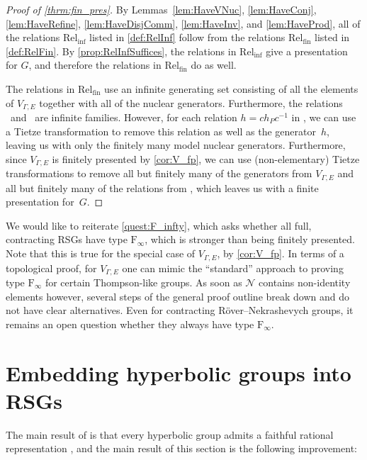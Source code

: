 \documentclass[11pt,letterpaper]{amsart}
\theoremstyle{definition}
\newcommand{\Nuc}{\mathcal{N}}
\newcommand{\Rel}{\mathrm{Rel}}
\newcommand{\F}{\mathrm{F}}
\begin{document}
\begin{proof}[Proof of \cref{thrm:fin_pres}]
By Lemmas~\ref{lem:HaveVNuc}, \ref{lem:HaveConj}, \ref{lem:HaveRefine}, \ref{lem:HaveDisjComm}, \ref{lem:HaveInv}, and \ref{lem:HaveProd}, all of the relations $\Rel_{\mathrm{inf}}$ listed in \cref{def:RelInf} follow from the relations $\Rel_{\mathrm{fin}}$ listed in \cref{def:RelFin}.  By \cref{prop:RelInfSuffices}, the relations in $\Rel_{\mathrm{inf}}$ give a presentation for $G$, and therefore the relations in $\Rel_{\mathrm{fin}}$ do as well.

The relations in $\Rel_{\mathrm{fin}}$ use an infinite generating set consisting of all the elements of $V_{\Gamma,E}$ together with all of the nuclear generators.  Furthermore, the relations \VRel\ and \Model\ are infinite families.  However, for each relation $h=ch_Pc^{-1}$ in \Model, we can use a Tietze transformation to remove this relation as well as the generator~$h$, leaving us with only the finitely many model nuclear generators.  Furthermore, since $V_{\Gamma,E}$ is finitely presented by \cref{cor:V_fp}, we can use (non-elementary) Tietze transformations to remove all but finitely many of the generators from $V_{\Gamma,E}$ and all but finitely many of the relations from \VRel, which leaves us with a finite presentation for~$G$.
\end{proof}

We would like to reiterate \cref{quest:F_infty}, which asks whether all full, contracting RSGs have type $\F_{\!\infty}$, which is stronger than being finitely presented. Note that this is true for the special case of $V_{\Gamma,E}$, by \cref{cor:V_fp}. In terms of a topological proof, for $V_{\Gamma,E}$ one can mimic the ``standard'' approach to proving type $\F_{\!\infty}$ for certain Thompson-like groups. As soon as $\Nuc$ contains non-identity elements however, several steps of the general proof outline break down and do not have clear alternatives. Even for contracting R\"over--Nekrashevych groups, it remains an open question whether they always have type $\F_{\!\infty}$.






\section{Embedding hyperbolic groups into RSGs}\label{sec:hyp}

The main result of \cite{BelkBleakMatucci} is that every hyperbolic group admits a faithful rational representation \cite[Theorem~1]{BelkBleakMatucci}, and the main result of this section is the following improvement:
\end{document}
